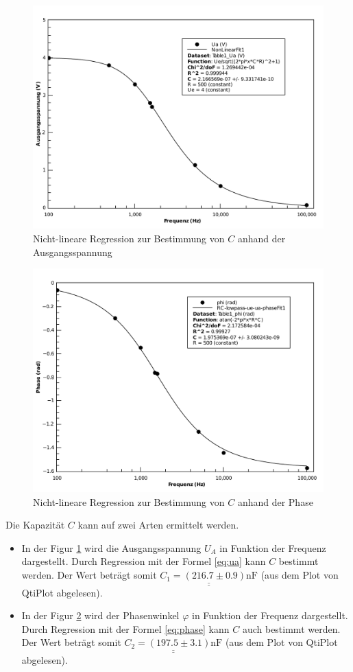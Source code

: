 \begin{figure}[H]
    \center
    \includegraphics[width=.8\textwidth]{qtiplot/rc-ua}
    \caption{Nicht-lineare Regression zur Bestimmung von $C$ anhand der Ausgangsspannung}
    \label{fig:rc-ua}
\end{figure}

\begin{figure}[H]
    \center
    \includegraphics[width=.8\textwidth]{qtiplot/rc-phase}
    \caption{Nicht-lineare Regression zur Bestimmung von $C$ anhand der Phase}
    \label{fig:rc-phase}
\end{figure}


Die Kapazit\"at $C$ kann auf zwei Arten ermittelt werden.

\begin{itemize}
    \item In der Figur \ref{fig:rc-ua} wird die Ausgangsspannung $U_A$ in Funktion der Frequenz dargestellt.
    Durch Regression mit der Formel \ref{eq:ua} kann $C$ bestimmt werden. Der Wert betr\"agt somit
    $\underline{\underline{C_1 = (216.7 \pm 0.9)\textrm{nF}}}$ (aus dem Plot von QtiPlot
    abgelesen).

    \item In der Figur \ref{fig:rc-phase} wird der Phasenwinkel $\varphi$ in Funktion der Frequenz dargestellt.
    Durch Regression mit der Formel \ref{eq:phase} kann $C$ auch bestimmt werden. Der Wert betr\"agt
    somit $\underline{\underline{C_2 = (197.5 \pm 3.1)\textrm{nF}}}$ (aus dem Plot von
    QtiPlot abgelesen).
\end{itemize}


